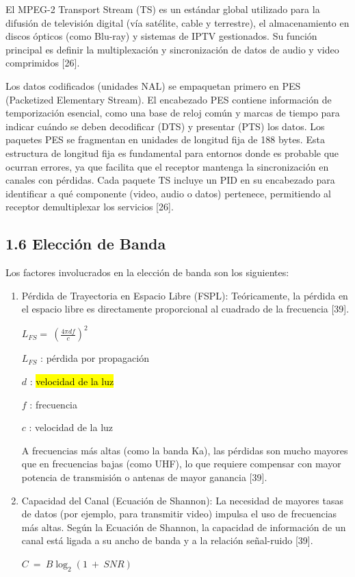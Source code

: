 \documentclass[12pt,a4paper]{article}
\begin{document}
El MPEG-2 Transport Stream (TS) es un estándar global utilizado para la difusión de televisión digital (vía satélite, cable y terrestre), el almacenamiento en discos ópticos (como Blu-ray) y sistemas de IPTV gestionados. Su función principal es definir la multiplexación y sincronización de datos de audio y video comprimidos {[}26{]}.

Los datos codificados (unidades NAL) se empaquetan primero en PES (Packetized Elementary Stream). El encabezado PES contiene información de temporización esencial, como una base de reloj común y marcas de tiempo para indicar cuándo se deben decodificar (DTS) y presentar (PTS) los datos. Los paquetes PES se fragmentan en unidades de longitud fija de 188 bytes. Esta estructura de longitud fija es fundamental para entornos donde es probable que ocurran errores, ya que facilita que el receptor mantenga la sincronización en canales con pérdidas. Cada paquete TS incluye un PID en su encabezado para identificar a qué componente (video, audio o datos) pertenece, permitiendo al receptor demultiplexar los servicios {[}26{]}.

\subsection{1.6 Elección de Banda}\label{elecciuxf3n-de-banda}

Los factores involucrados en la elección de banda son los siguientes:

\begin{enumerate}
\def\labelenumi{\arabic{enumi}.}
\item
  Pérdida de Trayectoria en Espacio Libre (FSPL): Teóricamente, la pérdida en el espacio libre es directamente proporcional al cuadrado de la frecuencia {[}39{]}.

  \(L_{FS} = \ {(\frac{4\pi df}{c})}^{2}\)

  \(L_{FS}\) : pérdida por propagación

  \(d\) : \hl{velocidad de la luz}

  \(f\) : frecuencia

  \(c\) : velocidad de la luz

  A frecuencias más altas (como la banda Ka), las pérdidas son mucho mayores que en frecuencias bajas (como UHF), lo que requiere compensar con mayor potencia de transmisión o antenas de mayor ganancia {[}39{]}.
\item
  Capacidad del Canal (Ecuación de Shannon): La necesidad de mayores tasas de datos (por ejemplo, para transmitir video) impulsa el uso de frecuencias más altas. Según la Ecuación de Shannon, la capacidad de información de un canal está ligada a su ancho de banda y a la relación señal-ruido {[}39{]}.

  \(C\  = \ B\log_{2}(1\  + \ SNR)\)
\end{enumerate}
\end{document}
